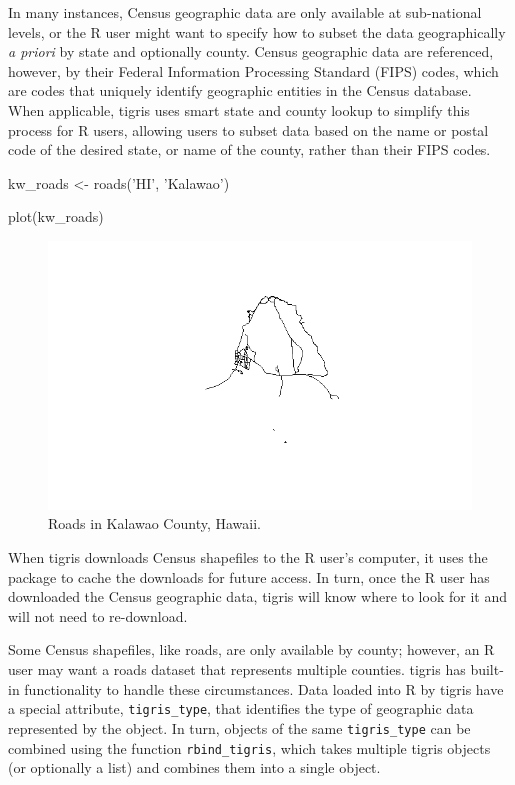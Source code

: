 In many instances, Census geographic data are only available at
sub-national levels, or the R user might want to specify how to subset
the data geographically \emph{a priori} by state and optionally county.
Census geographic data are referenced, however, by their Federal
Information Processing Standard (FIPS) codes, which are codes that
uniquely identify geographic entities in the Census database. When
applicable, tigris uses smart state and county lookup to simplify this
process for R users, allowing users to subset data based on the name or
postal code of the desired state, or name of the county, rather than
their FIPS codes.

\begin{Schunk}
\begin{Sinput}
kw_roads <- roads('HI', 'Kalawao')

plot(kw_roads)
\end{Sinput}
\end{Schunk}

\begin{figure}[htbp]
  \centering
  \includegraphics[width=\textwidth]{kalawao}
  \caption{Roads in Kalawao County, Hawaii.}
  \label{figure:kalawao}
\end{figure}

When tigris downloads Census shapefiles to the R user's computer, it
uses the  package to cache the downloads for future
access. In turn, once the R user has downloaded the Census geographic
data, tigris will know where to look for it and will not need to
re-download.

Some Census shapefiles, like roads, are only available by county;
however, an R user may want a roads dataset that represents multiple
counties. tigris has built-in functionality to handle these
circumstances. Data loaded into R by tigris have a special attribute,
\texttt{tigris\_type}, that identifies the type of geographic data
represented by the object. In turn, objects of the same
\texttt{tigris\_type} can be combined using the function
\texttt{rbind\_tigris}, which takes multiple tigris objects (or
optionally a list) and combines them into a single object.

